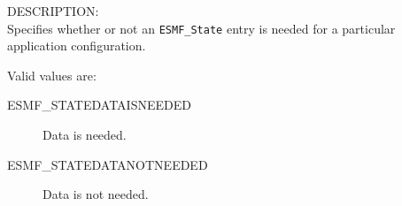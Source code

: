 {\sf DESCRIPTION:\\}
Specifies whether or not an {\tt ESMF\_State} entry is needed for a 
particular application configuration.

Valid values are:
\begin{description}
   \item [ESMF\_STATEDATAISNEEDED] 
         Data is needed.
   \item [ESMF\_STATEDATANOTNEEDED]
         Data is not needed.
\end{description}






